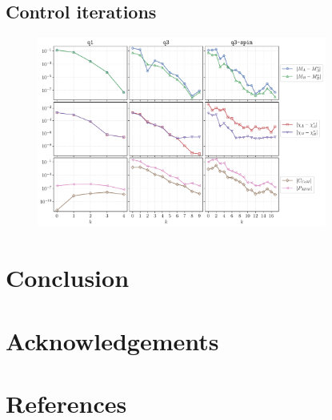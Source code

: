 \documentclass{../document}
\begin{document}
    \subsection{Control iterations}

      \begin{figure}
        \centering
        \includegraphics[width=0.85\textwidth]{../../plots/final_report/control_iterations.pdf}
        \caption{}
        \label{fig:control_iterations}
      \end{figure}

  \section{Conclusion}

  \section*{Acknowledgements}

  \section*{References}

	  \printbibliography[heading=none]
  
\end{document}
